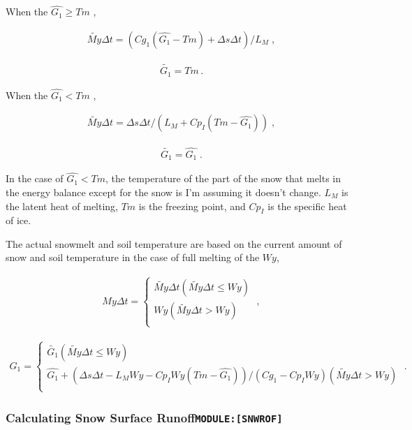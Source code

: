 When the \(\hat{G_1} \ge Tm\) ,

\begin{eqnarray}
\tilde{My} \Delta t = ( Cg_1 ( \hat{G_1} - Tm ) + \Delta s \Delta t ) / L_M \; ,
\end{eqnarray}

\begin{eqnarray}
\tilde{G_1} = Tm \, .
\end{eqnarray}

When the \(\hat{G_1} < Tm\) ,

\begin{eqnarray}
\tilde{My} \Delta t = \Delta s \Delta t / ( L_M + Cp_I ( Tm - \hat{G_1} ) ) \; ,
\end{eqnarray}

\begin{eqnarray}
\tilde{G_1} = \hat{G_1} \; .
\end{eqnarray}

In the case of \(\hat{G_1} < Tm\), the temperature of the part of the
snow that melts in the energy balance except for the snow is I'm
assuming it doesn't change. \(L_M\) is the latent heat of melting,
\(Tm\) is the freezing point, and \(Cp_I\) is the specific heat of ice.

The actual snowmelt and soil temperature are based on the current amount
of snow and soil temperature in the case of full melting of the \(Wy\),

\begin{eqnarray}
My \Delta t = \left\{
   \begin{array}{ll}
      \tilde{My} \Delta t  ( \tilde{My} \Delta t \le Wy ) \\
      Wy                   ( \tilde{My} \Delta t >   Wy ) \\
   \end{array}
\right. \; ,
\end{eqnarray}

\begin{eqnarray}
G_1 = \left\{
   \begin{array}{ll}
      \tilde{G_1}   ( \tilde{My} \Delta t \le Wy ) \\
      \hat{G_1} + ( \Delta s \Delta t - L_M Wy - Cp_I Wy ( Tm - \hat{G_1} ) )
                / ( Cg_1 - Cp_I Wy )
                    ( \tilde{My} \Delta t >   Wy ) \\
   \end{array}
\right. \; .
\end{eqnarray}

\hypertarget{calculating-snow-surface-runoffmodulesnwrof}{%
\subsubsection{\texorpdfstring{Calculating Snow Surface
Runoff\texttt{MODULE:{[}SNWROF{]}}}{Calculating Snow Surface RunoffMODULE:{[}SNWROF{]}}}\label{calculating-snow-surface-runoffmodulesnwrof}}

